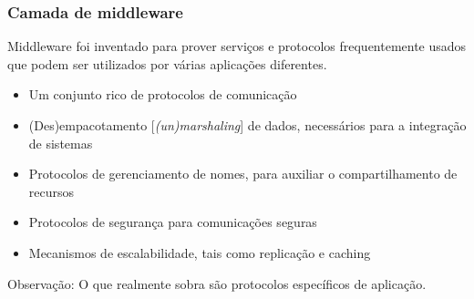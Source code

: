 \documentclass[Ligatures=TeX,table,brazil,svgnames,usetotalslideindicator,compress,10pt]{beamer}
\begin{document}
\begin{frame}
  \frametitle{Camada de middleware}
  \begin{block}{}
    Middleware foi inventado para prover serviços e protocolos
    \alert{frequentemente usados} que podem ser utilizados por várias
    aplicações \alert{diferentes}.
  \end{block}

  \begin{itemize}
  \item Um conjunto rico de \alert{protocolos de comunicação}
  \item \alert{(Des)empacotamento} [\textit{(un)marshaling}] de dados, necessários para a integração de sistemas
  \item \alert{Protocolos de gerenciamento de nomes}, para auxiliar o compartilhamento de recursos
  \item \alert{Protocolos de segurança} para comunicações seguras
  \item \alert{Mecanismos de escalabilidade}, tais como replicação e caching
  \end{itemize}

  \small
  \begin{alertblock}{Observação:}
    O que realmente sobra são protocolos específicos de aplicação.
  \end{alertblock}

\end{frame}
\end{document}
